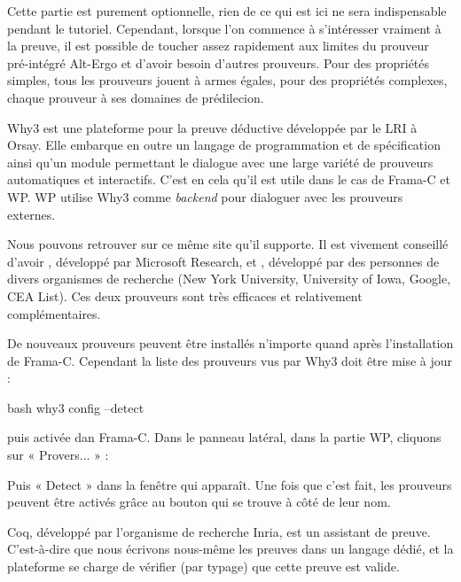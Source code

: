 

Cette partie est purement optionnelle, rien de ce qui est ici ne sera
indispensable pendant le tutoriel. Cependant, lorsque l'on commence à
s'intéresser vraiment à la preuve, il est possible de toucher assez rapidement
aux limites du prouveur pré-intégré Alt-Ergo et d'avoir besoin d'autres
prouveurs. Pour des propriétés simples, tous les prouveurs jouent à armes
égales, pour des propriétés complexes, chaque prouveur à ses domaines de
prédilecion.



Why3 est une plateforme pour la preuve déductive développée par le LRI à Orsay.
Elle embarque en outre un langage de programmation et de spécification ainsi
qu'un module permettant le dialogue avec une large variété de prouveurs
automatiques et interactifs. C'est en cela qu'il est utile dans le cas de
Frama-C et WP. WP utilise Why3 comme \textit{backend} pour dialoguer avec les
prouveurs externes.


Nous pouvons retrouver sur ce même site
 qu'il supporte.
Il est vivement conseillé d'avoir ,
développé par Microsoft Research, et ,
développé par des personnes de divers organismes de recherche (New York
University, University of Iowa, Google, CEA List). Ces deux prouveurs sont très
efficaces et relativement complémentaires.


De nouveaux prouveurs peuvent être installés n'importe quand après
l'installation de Frama-C. Cependant la liste des prouveurs vus par Why3
doit être mise à jour :


\begin{CodeBlock}{bash}
why3 config --detect
\end{CodeBlock}


puis activée dan Frama-C. Dans le panneau latéral, dans la partie WP,
cliquons sur « Provers... » :




Puis « Detect » dans la fenêtre qui apparaît. Une fois que c'est fait,
les prouveurs peuvent être activés grâce au bouton qui se trouve à côté
de leur nom.






Coq, développé par l'organisme de recherche Inria, est un assistant de
preuve. C'est-à-dire que nous écrivons nous-même les preuves dans un
langage dédié, et la plateforme se charge de vérifier (par typage) que
cette preuve est valide.



